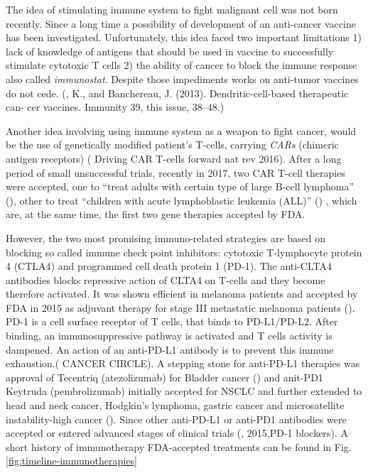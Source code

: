 \documentclass[12pt,]{book}
\theoremstyle{definition}
\theoremstyle{definition}
\theoremstyle{definition}
\theoremstyle{remark}
\begin{document}
The idea of stimulating immune system to fight malignant cell was not
born recently. Since a long time a possibility of development of an
anti-cancer vaccine has been investigated. Unfortunately, this idea
faced two important limitations 1) lack of knowledge of antigens that
should be used in vaccine to successfully stimulate cytotoxic T cells 2)
the ability of cancer to block the immune response also called
\emph{immunostat}. Despite those impediments works on anti-tumor
vaccines do not cede. (\citet{Palucka}, K., and Banchereau, J. (2013).
Dendritic-cell-based therapeutic can- cer vaccines. Immunity 39, this
issue, 38--48.)

Another idea involving using immune system as a weapon to fight cancer,
would be the use of genetically modified patient's T-cells, carrying
\emph{CARs} (chimeric antigen receptors) (\citet{Jackson} Driving CAR
T-cells forward nat rev 2016). After a long period of small unsuccessful
trials, recently in 2017, two CAR T-cell therapies were accepted, one to
``treat adults with certain type of large B-cell lymphoma''
(\citet{FDA_CAR-T_adult}), other to treat ``children with acute
lymphoblastic leukemia (ALL)'' (\citet{FDA_CAR-T_ALL}) , which are, at
the same time, the first two gene therapies accepted by FDA.

However, the two most promising immuno-related strategies are based on
blocking so called immune check point inhibitors: cytotoxic T-lymphocyte
protein 4 (CTLA4) and programmed cell death protein 1 (PD-1). The
anti-CLTA4 antibodies blocks repressive action of CLTA4 on T-cells and
they become therefore activated. It was shown efficient in melanoma
patients and accepted by FDA in 2015 as adjuvant therapy for stage III
metastatic melanoma patients (\citet{FDA_CTLA4}). PD-1 is a cell surface
receptor of T cells, that binds to PD-L1/PD-L2. After binding, an
immunosuppressive pathway is activated and T cells activity is dampened.
An action of an anti-PD-L1 antibody is to prevent this immune
exhaustion.(\citet{IMMUNE} CANCER CIRCLE). A stepping stone for
anti-PD-L1 therapies was approval of Tecentriq (atezolizumab) for
Bladder cancer (\citet{FDA_PDL1_Bladder}) and anit-PD1 Keytruda
(pembrolizumab) initially accepted for NSCLC and further extended to
head and neck cancer, Hodgkin's lymphoma, gastric cancer and
microsatellite instability-high cancer (\citet{FDA_PDL1_NSCLC}). Since
other anti-PD-L1 or anti-PD1 antibodies were accepted or entered
advanced stages of clinical trials (\citet{Wolchok}, 2015,PD-1
blockers). A short history of immunotherapy FDA-accepted treatments can
be found in Fig. \ref{fig:timeline-immunotherapies}
\end{document}
